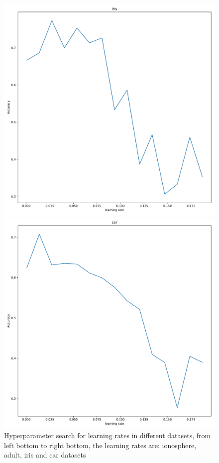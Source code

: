 \documentclass[11pt]{scrartcl}
\begin{document}
\begin{figure}[H]
\begin{minipage}{0.7\linewidth}
\begin{minipage}[b]{0.48\linewidth}
		\end{minipage}
		\begin{minipage}[b]{0.48\linewidth}
			\centering
			\includegraphics[width= \linewidth]{fig/iris_lr.pdf}
		  \end{minipage}
		  \hfill
		  \begin{minipage}[b]{0.48\linewidth}
			\centering			
			\includegraphics[width= \linewidth]{fig/car_lr.pdf}
		  \end{minipage}
	\end{minipage}
	\caption{Hyperparameter search for learning rates in different datasets, from left bottom to right bottom, the learning rates are: ionosphere, adult, iris and car datasets}
	\label{lr_test}
\end{figure}
\end{document}
